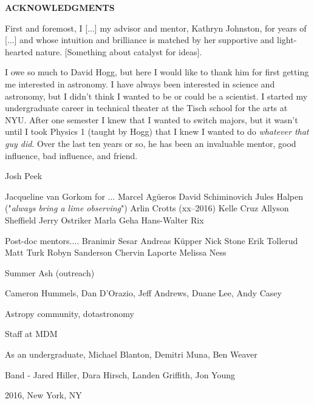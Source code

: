 \newpage

\begin{center}

{\large \bf ACKNOWLEDGMENTS }

\end{center}

\vspace{0.8cm}

First and foremost, I [...] my advisor and mentor, Kathryn Johnston, for years of [...] and whose intuition and brilliance is matched by her supportive and light-hearted nature. [Something about catalyst for ideas]. 

I owe so much to David Hogg, but here I would like to thank him for first getting me interested in astronomy. I have always been interested in science and astronomy, but I didn't think I wanted to be or could be a scientist. I started my undergraduate career in technical theater at the Tisch school for the arts at NYU. After one semester I knew that I wanted to switch majors, but it wasn't until I took Physics 1 (taught by Hogg) that I knew I wanted to do \emph{whatever that guy did}. Over the last ten years or so, he has been an invaluable mentor, good influence, bad influence, and friend.

Josh Peek

Jacqueline van Gorkom for ...
Marcel Ag\"ueros
David Schiminovich
Jules Halpen ("\emph{always bring a lime observing}")
Arlin Crotts (xx--2016)
Kelle Cruz
Allyson Sheffield
Jerry Ostriker
Marla Geha
Hans-Walter Rix

Post-doc mentors....
Branimir Sesar
Andreas K\"upper
Nick Stone
Erik Tollerud
Matt Turk
Robyn Sanderson
Chervin Laporte
Melissa Ness

Summer Ash (outreach)

Cameron Hummels, Dan D'Orazio, Jeff Andrews, Duane Lee, Andy Casey

Astropy community, dotastronomy

Staff at MDM

As an undergraduate, Michael Blanton, Demitri Muna, Ben Weaver

Band - Jared Hiller, Dara Hirsch, Landen Griffith, Jon Young

\vspace{1.8cm}
2016, New York, NY

